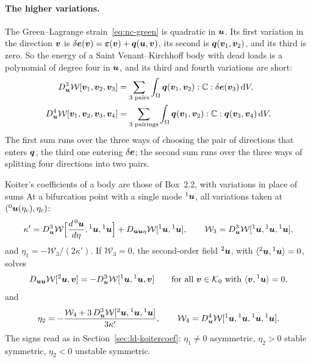 \paragraph{The higher variations.}
The Green--Lagrange strain~\eqref{eq:nc-green} is quadratic in $\bm{u}$. Its first variation in
the direction $\bm{v}$ is $\delta\bm{e}(\bm{v}) = \bm{\varepsilon}(\bm{v}) + \bm{q}(\bm{u},\bm{v})$, its second is
$\bm{q}(\bm{v}_1,\bm{v}_2)$, and its third is zero. So the energy of a Saint Venant--Kirchhoff
body with dead loads is a polynomial of degree four in $\bm{u}$, and its third and fourth
variations are short:
\begin{align}
  D^3_{\bm{u}}\mathcal{W}[\bm{v}_1,\bm{v}_2,\bm{v}_3] &= \sum_{\text{3 pairs}}\int_\Omega
     \bm{q}(\bm{v}_1,\bm{v}_2):\mathbb{C}:\delta\bm{e}(\bm{v}_3)\,\mathrm{d} V ,
   \label{eq:nc-third}\\
  D^4_{\bm{u}}\mathcal{W}[\bm{v}_1,\bm{v}_2,\bm{v}_3,\bm{v}_4] &= \sum_{\text{3 pairings}}\int_\Omega
     \bm{q}(\bm{v}_1,\bm{v}_2):\mathbb{C}:\bm{q}(\bm{v}_3,\bm{v}_4)\,\mathrm{d} V .
   \label{eq:nc-fourth}
\end{align}
The first sum runs over the three ways of choosing the pair of directions that enters
$\bm{q}$, the third one entering $\delta\bm{e}$; the second sum runs over the three ways of
splitting four directions into two pairs.

\begin{gbox}{Koiter's coefficients of a body are those of Box~2.2, with variations in place of sums}\label{sec:nc-koiter-var}
%
At a bifurcation point with a single mode ${}^1\bm{u}$, all variations taken at
$({}^0\bm{u}(\eta_c),\eta_c)$:
\begin{equation}\label{eq:nc-kappa}
  \kappa' = D^3_{\bm{u}}\mathcal{W}\Bigl[\frac{d\,{}^0\bm{u}}{d\eta},{}^1\bm{u},{}^1\bm{u}\Bigr]
          + D_{\bm{u}\bm{u}\eta}\mathcal{W}[{}^1\bm{u},{}^1\bm{u}],
  \qquad
  \mathcal{W}_3 = D^3_{\bm{u}}\mathcal{W}[{}^1\bm{u},{}^1\bm{u},{}^1\bm{u}],
\end{equation}
and $\eta_1 = -\mathcal{W}_3/(2\kappa')$. If $\mathcal{W}_3 = 0$, the second-order field
${}^2\bm{u}$, with $\langle {}^2\bm{u},{}^1\bm{u}\rangle = 0$, solves
\begin{equation}\label{eq:nc-u2}
  D_{\bm{u}\bm{u}}\mathcal{W}[{}^2\bm{u},\bm{v}] = -D^3_{\bm{u}}\mathcal{W}[{}^1\bm{u},{}^1\bm{u},\bm{v}]
  \qquad\text{for all } \bm{v}\in\mathcal{K}_0 \text{ with } \langle \bm{v},{}^1\bm{u}\rangle = 0,
\end{equation}
and
\begin{equation}\label{eq:nc-eta2}
  \eta_2 = -\frac{\mathcal{W}_4 + 3\,D^3_{\bm{u}}\mathcal{W}[{}^2\bm{u},{}^1\bm{u},{}^1\bm{u}]}{3\kappa'},
  \qquad
  \mathcal{W}_4 = D^4_{\bm{u}}\mathcal{W}[{}^1\bm{u},{}^1\bm{u},{}^1\bm{u},{}^1\bm{u}] .
\end{equation}
The signs read as in Section~\ref{sec:ld-koitercoef}: $\eta_1 \neq 0$ asymmetric,
$\eta_2 > 0$ stable symmetric, $\eta_2 < 0$ unstable symmetric.
\end{gbox}


